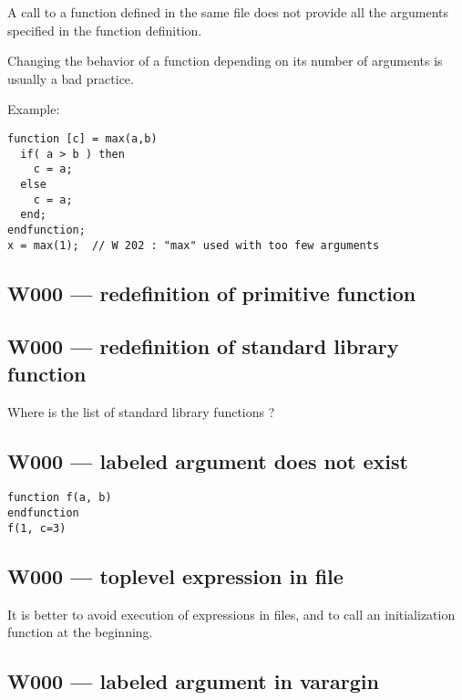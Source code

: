 A call to a function defined in the same file does not provide all the
arguments specified in the function definition.



Changing the behavior of a function depending on its number of
arguments is usually a bad practice.



Example:\begin{verbatim}
function [c] = max(a,b)
  if( a > b ) then
    c = a;
  else
    c = a;
  end;
endfunction;
x = max(1);  // W 202 : "max" used with too few arguments
\end{verbatim}




\subsection{W000 --- redefinition of primitive function}




\subsection{W000 --- redefinition of standard library function}




Where is the list of standard library functions ?



\subsection{W000 --- labeled argument does not exist}


\begin{verbatim}
function f(a, b)
endfunction
f(1, c=3)
\end{verbatim}


\subsection{W000 --- toplevel expression in file}




It is better to avoid execution of expressions in files, and
to call an initialization function at the beginning.



\subsection{W000 --- labeled argument in varargin}




